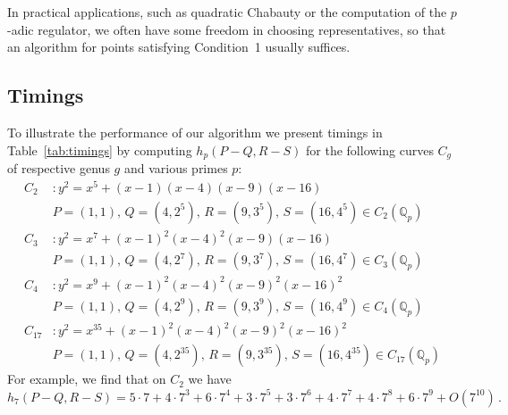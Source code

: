 \documentclass[11pt, a4paper]{amsart}
\newcommand{\Q}{\mathbb{Q}}
\theoremstyle{remark}
\numberwithin{equation}{section}
\begin{document}
In practical applications, such as quadratic Chabauty or the computation of the $p$-adic
regulator, we often have some freedom in choosing representatives, so that an algorithm
for points satisfying Condition~1 usually suffices. 



\subsection{Timings}\label{subsec:timings}
To illustrate the performance of our algorithm we present timings in
Table~\ref{tab:timings} by computing $h_p(P-Q, R-S)$ for the following curves $C_g$ of respective genus
$g$ and various primes $p$:
\begin{align*}
  C_2&\colon y^2=x^5+(x-1)(x-4)(x-9)(x-16)\\
    &P=(1,1),\, Q=(4,2^5),\,R=(9,3^5),\,S=(16,4^5) \in C_2(\Q_p)\\
  C_3&\colon y^2=x^7+(x-1)^2(x-4)^2(x-9)(x-16)\\ 
    &P=(1,1),\, Q=(4,2^7),\,R=(9,3^7),\,S=(16,4^7) \in C_3(\Q_p)\\
  C_4&\colon y^2=x^9+(x-1)^2(x-4)^2(x-9)^2(x-16)^2\\ 
    &P=(1,1),\, Q=(4,2^9),\,R=(9,3^9),\,S=(16,4^9) \in C_4(\Q_p)\\
  C_{17}&\colon y^2=x^{35}+(x-1)^2(x-4)^2(x-9)^2(x-16)^2\\
    &P=(1,1),\, Q=(4,2^{35}),\,R=(9,3^{35}),\,S=(16,4^{35}) \in C_{17}(\Q_p)
\end{align*}
For example, we find that on $C_2$ we have
\[h_7(P-Q,R-S)= 5\cdot7 + 4\cdot7^3 + 6\cdot7^4 + 3\cdot7^5 + 3\cdot7^6 +
4\cdot7^7 + 4\cdot7^8 + 6\cdot7^9 + O(7^{10})\,.
\]
\end{document}
